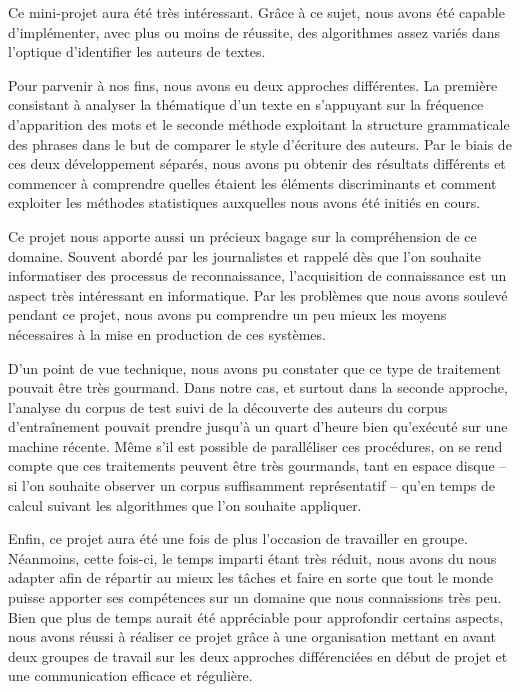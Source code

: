 \documentclass[a4paper,12pt]{report}
\begin{document}
Ce mini-projet aura été très intéressant. Grâce à ce sujet, nous avons été capable d'implémenter, avec plus ou moins de réussite, des algorithmes assez variés dans l'optique d'identifier les auteurs de textes.

Pour parvenir à nos fins, nous avons eu deux approches différentes. La première consistant à analyser la thématique d'un texte en s'appuyant sur la fréquence d'apparition des mots et le seconde méthode exploitant la structure grammaticale des phrases dans le but de comparer le style d'écriture des auteurs. Par le biais de ces deux développement séparés, nous avons pu obtenir des résultats différents et commencer à comprendre quelles étaient les éléments discriminants et comment exploiter les méthodes statistiques auxquelles nous avons été initiés en cours.

Ce projet nous apporte aussi un précieux bagage sur la compréhension de ce domaine. Souvent abordé par les journalistes et rappelé dès que l'on souhaite informatiser des processus de reconnaissance, l'acquisition de connaissance est un aspect très intéressant en informatique. Par les problèmes que nous avons soulevé pendant ce projet, nous avons pu comprendre un peu mieux les moyens nécessaires à la mise en production de ces systèmes.

D'un point de vue technique, nous avons pu constater que ce type de traitement pouvait être très gourmand. Dans notre cas, et surtout dans la seconde approche, l'analyse du corpus de test suivi de la découverte des auteurs du corpus d'entraînement pouvait prendre jusqu'à un quart d'heure bien qu'exécuté sur une machine récente. Même s'il est possible de paralléliser ces procédures, on se rend compte que ces traitements peuvent être très gourmands, tant en espace disque -- si l'on souhaite observer un corpus suffisamment représentatif -- qu'en temps de calcul suivant les algorithmes que l'on souhaite appliquer.

Enfin, ce projet aura été une fois de plus l'occasion de travailler en groupe. Néanmoins, cette fois-ci, le temps imparti étant très réduit, nous avons du nous adapter afin de répartir au mieux les tâches et faire en sorte que tout le monde puisse apporter ses compétences sur un domaine que nous connaissions très peu. Bien que plus de temps aurait été appréciable pour approfondir certains aspects, nous avons réussi à réaliser ce projet grâce à une organisation mettant en avant deux groupes de travail sur les deux approches différenciées en début de projet et une communication efficace et régulière.
\end{document}
